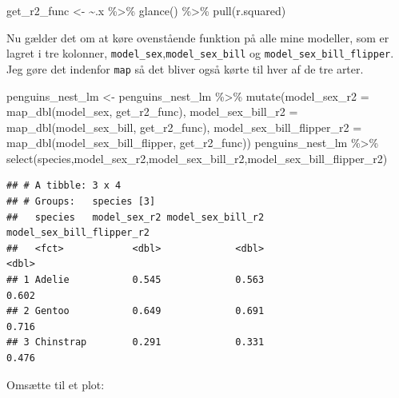 \documentclass[
]{book}
\newenvironment{Shaded}{\begin{snugshade}}{\end{snugshade}}
\newcommand{\AttributeTok}[1]{\textcolor[rgb]{0.77,0.63,0.00}{#1}}
\newcommand{\ErrorTok}[1]{\textcolor[rgb]{0.64,0.00,0.00}{\textbf{#1}}}
\newcommand{\FunctionTok}[1]{\textcolor[rgb]{0.00,0.00,0.00}{#1}}
\newcommand{\NormalTok}[1]{#1}
\newcommand{\OtherTok}[1]{\textcolor[rgb]{0.56,0.35,0.01}{#1}}
\newcommand{\SpecialCharTok}[1]{\textcolor[rgb]{0.00,0.00,0.00}{#1}}
\begin{document}
\begin{Shaded}
\begin{Highlighting}[]
\NormalTok{get\_r2\_func }\OtherTok{\textless{}{-}} \ErrorTok{\textasciitilde{}}\NormalTok{.x }\SpecialCharTok{\%\textgreater{}\%} \FunctionTok{glance}\NormalTok{() }\SpecialCharTok{\%\textgreater{}\%} \FunctionTok{pull}\NormalTok{(r.squared)}
\end{Highlighting}
\end{Shaded}

Nu gælder det om at køre ovenstående funktion på alle mine modeller, som er lagret i tre kolonner, \texttt{model\_sex},\texttt{model\_sex\_bill} og \texttt{model\_sex\_bill\_flipper}. Jeg gøre det indenfor \texttt{map} så det bliver også kørte til hver af de tre arter.

\begin{Shaded}
\begin{Highlighting}[]
\NormalTok{penguins\_nest\_lm }\OtherTok{\textless{}{-}}\NormalTok{  penguins\_nest\_lm }\SpecialCharTok{\%\textgreater{}\%}
  \FunctionTok{mutate}\NormalTok{(}\AttributeTok{model\_sex\_r2 =}              \FunctionTok{map\_dbl}\NormalTok{(model\_sex,              get\_r2\_func),}
         \AttributeTok{model\_sex\_bill\_r2 =}         \FunctionTok{map\_dbl}\NormalTok{(model\_sex\_bill,         get\_r2\_func),}
         \AttributeTok{model\_sex\_bill\_flipper\_r2 =} \FunctionTok{map\_dbl}\NormalTok{(model\_sex\_bill\_flipper, get\_r2\_func))}
\NormalTok{penguins\_nest\_lm }\SpecialCharTok{\%\textgreater{}\%} \FunctionTok{select}\NormalTok{(species,model\_sex\_r2,model\_sex\_bill\_r2,model\_sex\_bill\_flipper\_r2)}
\end{Highlighting}
\end{Shaded}

\begin{verbatim}
## # A tibble: 3 x 4
## # Groups:   species [3]
##   species   model_sex_r2 model_sex_bill_r2 model_sex_bill_flipper_r2
##   <fct>            <dbl>             <dbl>                     <dbl>
## 1 Adelie           0.545             0.563                     0.602
## 2 Gentoo           0.649             0.691                     0.716
## 3 Chinstrap        0.291             0.331                     0.476
\end{verbatim}

Omsætte til et plot:
\end{document}
